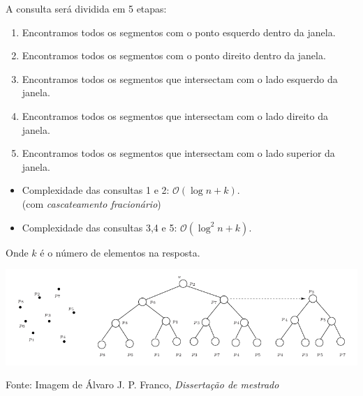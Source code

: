 \documentclass[
paper=128mm:96mm, %
fontsize=11pt, %
pagesize, %
parskip=half-, %
]{scrartcl} %
\theoremstyle{mythmstyle} %
\begin{document}
\clearpage
\begin{flushleft}
  A consulta será dividida em 5 etapas:\\
  \small  
  \begin{enumerate}
  \item Encontramos todos os segmentos com o ponto esquerdo dentro da janela.
  \item Encontramos todos os segmentos com o ponto direito dentro da janela.
  \item Encontramos todos os segmentos que intersectam com o lado esquerdo da janela.
  \item Encontramos todos os segmentos que intersectam com o lado direito da janela.
  \item Encontramos todos os segmentos que intersectam com o lado superior da janela.
  \end{enumerate}
\end{flushleft}
\clearpage
\clearpage
  \begin{itemize}
  \item Complexidade das consultas 1 e 2: $\mathcal{O}(\log n + k)$.\\(com \emph{cascateamento fracionário})
  \item Complexidade das consultas 3,4 e 5: $\mathcal{O}(\log^2 n + k)$.\\
  \end{itemize}
  Onde $k$ é o número de elementos na resposta.

\clearpage

\includegraphics[width=\textwidth,height=0.6\textheight]{3}
\begin{flushleft}
\tiny Fonte: Imagem de Álvaro J. P. Franco, \emph{Dissertação de mestrado} \cite{junio09:MSc}
\normalsize
\end{flushleft}
\clearpage
\thispagestyle{empty} %
\printbibliography

\clearpage
\clearpage
\end{document}
